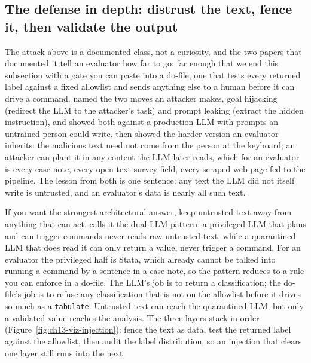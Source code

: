 \documentclass[
    a4paper,
    fontsize=10pt,
    twoside=true,
    numbers=noenddot,
]{kaobook}
\begin{document}
\subsection{The defense in depth: distrust the text, fence it, then validate the output}\label{sec:ch13-injection-depth}
The attack above is a documented class, not a curiosity, and the two papers that documented it tell an evaluator how far to go: far enough that we end this subsection with a gate you can paste into a do-file, one that tests every returned label against a fixed allowlist and sends anything else to a human before it can drive a command. \textcite{perez2022ignore} named the two moves an attacker makes, goal hijacking (redirect the LLM to the attacker's task) and prompt leaking (extract the hidden instruction), and showed both against a production LLM with prompts an untrained person could write. \textcite{greshake2023injection} then showed the harder version an evaluator inherits: the malicious text need not come from the person at the keyboard; an attacker can plant it in any content the LLM later reads, which for an evaluator is every case note, every open-text survey field, every scraped web page fed to the pipeline. The lesson from both is one sentence: any text the LLM did not itself write is untrusted, and an evaluator's data is nearly all such text.

If you want the strongest architectural answer, keep untrusted text away from anything that can act. \textcite{willison2023dual} calls it the dual-LLM pattern: a privileged LLM that plans and can trigger commands never reads raw untrusted text, while a quarantined LLM that does read it can only return a value, never trigger a command. For an evaluator the privileged half is Stata, which already cannot be talked into running a command by a sentence in a case note, so the pattern reduces to a rule you can enforce in a do-file. The LLM's job is to return a classification; the do-file's job is to refuse any classification that is not on the allowlist before it drives so much as a \texttt{tabulate}. Untrusted text can reach the quarantined LLM, but only a validated value reaches the analysis. The three layers stack in order (Figure~\ref{fig:ch13-viz-injection}): fence the text as data, test the returned label against the allowlist, then audit the label distribution, so an injection that clears one layer still runs into the next.
\end{document}
